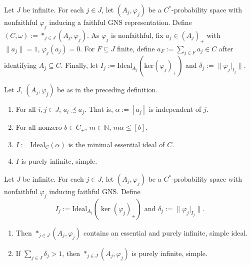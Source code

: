 \documentclass[10pt,a4paper]{amsart}
\begin{document}
\begin{defn}\label{index}
    Let $J$ be infinite. For each $j\in J$, let $(A_j,\varphi_j)$ be a $C^*$-probability space with nonfaithful $\varphi_j$ inducing a faithful GNS representation. Define $(C,\omega):=\ast_{j\in J} (A_j,\varphi_j)$. As $\varphi_j$ is nonfaithful, fix $a_j\in (A_j)_+$ with $\|a_j\|=1$, $\varphi_j(a_j)=0$. For $F\subseteq J$ finite, define $a_F:=\sum_{j\in F}a_j\in C$ after identifying $A_j\subseteq C$. Finally, let $I_j:=\mathrm{Ideal}_{A_j}(\mathrm{ker}(\varphi_j)_+)$ and $\delta_j:=\|\varphi_j|_{I_j}\|$.
\end{defn}

\begin{lem}\label{tail}
    Let $J$, $(A_j,\varphi_j)$ be as in the preceding definition. 
    \begin{enumerate}[label=(\roman*)]
        \item For all $i,j\in J$, $a_i\precsim a_j$. That is, $\alpha:=[a_j]$ is independent of $j$.
        \item For all nonzero $b\in C_+$, $m\in\mathbb{N}$, $m\alpha\leq[b]$.
        \item $I:=\mathrm{Ideal}_C(\alpha)$ is the minimal essential ideal of $C$.
        \item $I$ is purely infinite, simple.
    \end{enumerate}
\end{lem}

\begin{thm}\label{freedich2}
    Let $J$ be infinite. For each $j\in J$, let $(A_j,\varphi_j)$ be a $C^*$-probability space with nonfaithful $\varphi_j$ inducing faithful GNS. Define 
    \[I_j:=\mathrm{Ideal}_{A_j}(\ker(\varphi_j)_+)\text{ and }\delta_j:=\|\varphi_j|_{I_j}\|.\] 
    \begin{enumerate}[label=(\roman*)]
        \item Then $\ast_{j\in J}(A_j,\varphi_j)$ contains an essential and purely infinite, simple ideal.
        \item If $\sum_{j\in J}\delta_j>1$, then $\ast_{j\in J}(A_j,\varphi_j)$ is purely infinite, simple.
    \end{enumerate}
\end{thm}
\end{document}

